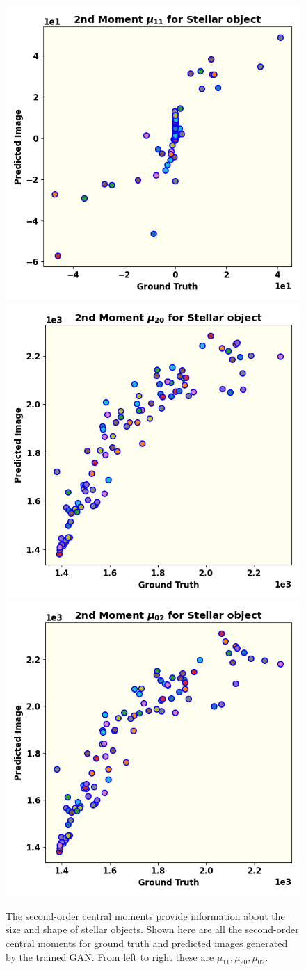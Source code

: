 \begin{figure}
  \includegraphics[width=.32\linewidth]{fig/moments/mom3.png}\hfil
  \includegraphics[width=.32\linewidth]{fig/moments/mom4.png}\hfil
  \includegraphics[width=.32\linewidth]{fig/moments/mom5.png}
  \caption{The second-order central moments provide information about the size and shape of stellar objects.  Shown here are all the second-order central moments for ground truth and predicted images generated by the trained GAN. From left to right these are $\mu_{11},\mu_{20},\mu_{02}$.}
	\label{fig:struc}
\end{figure}
